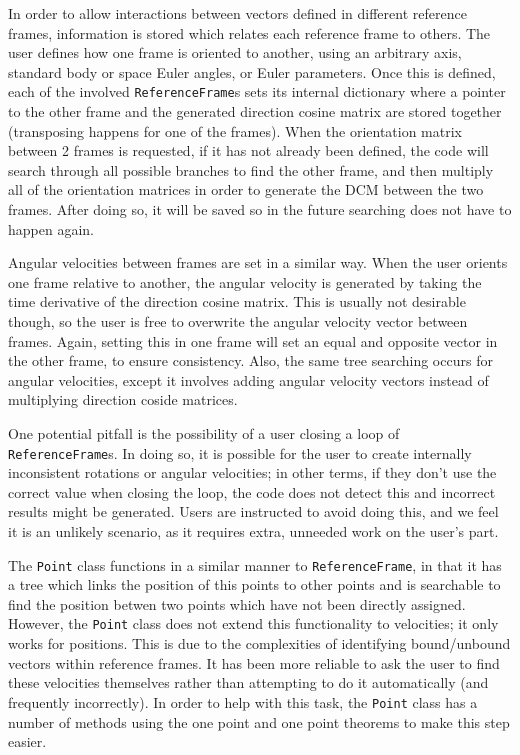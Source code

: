 \documentclass[twocolumn,10pt]{asme2e}
\begin{document}
In order to allow interactions between vectors defined in different reference
frames, information is stored which relates each reference frame to others.
The user defines how one frame is oriented to another, using an arbitrary axis,
standard body or space Euler angles, or Euler parameters.
Once this is defined, each of the involved \verb|ReferenceFrame|s sets its
internal dictionary where a pointer to the other frame and the generated
direction cosine matrix are stored together (transposing happens for one of the
frames).
When the orientation matrix between 2 frames is requested, if it has not
already been defined, the code will search through all possible branches to
find the other frame, and then multiply all of the orientation matrices in
order to generate the DCM between the two frames.
After doing so, it will be saved so in the future searching does not have to
happen again.

Angular velocities between frames are set in a similar way.
When the user orients one frame relative to another, the angular velocity is
generated by taking the time derivative of the direction cosine matrix.
This is usually not desirable though, so the user is free to overwrite the
angular velocity vector between frames.
Again, setting this in one frame will set an equal and opposite vector in the
other frame, to ensure consistency.
Also, the same tree searching occurs for angular velocities, except it involves
adding angular velocity vectors instead of multiplying direction coside matrices.

One potential pitfall is the possibility of a user closing a loop of
\verb|ReferenceFrame|s.
In doing so, it is possible for the user to create internally inconsistent
rotations or angular velocities; in other terms, if they don't use the correct
value when closing the loop, the code does not detect this and incorrect
results might be generated.
Users are instructed to avoid doing this, and we feel it is an unlikely
scenario, as it requires extra, unneeded work on the user's part.

The \verb|Point| class functions in a similar manner to \verb|ReferenceFrame|,
in that it has a tree which links the position of this points to other points
and is searchable to find the position betwen two points which have not been
directly assigned.
However, the \verb|Point| class does not extend this functionality to
velocities; it only works for positions.
This is due to the complexities of identifying bound/unbound vectors within
reference frames.
It has been more reliable to ask the user to find these velocities themselves
rather than attempting to do it automatically (and frequently incorrectly).
In order to help with this task, the \verb|Point| class has a number of methods
using the one point and one point theorems \cite{Kane1985} to make this step
easier.
\end{document}
